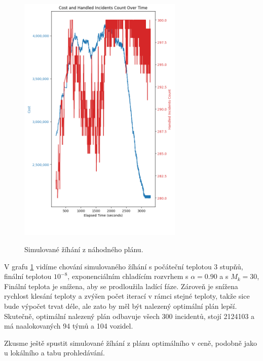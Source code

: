 \begin{figure}[H]
  \caption{Simulované žíhání z náhodného plánu.}
  \includegraphics[width=0.7\textwidth,height=0.9\textwidth]{img/plots/sa_random_90.png}
  \centering
  \label{img:sa_random}
\end{figure}

V grafu \ref{img:sa_random} vidíme chování simulovaného žíhání
s počáteční teplotou 3 stupňů, finální teplotou $10^{-8}$, exponenciálním chladícím rozvrhem s $\alpha = 0.90$ a s $M_k = 30$,
Finální teplota je snížena, aby se prodloužila ladící fáze.
Zároveň je snížena rychlost klesání teploty a zvýšen počet iterací v rámci stejné teploty, takže sice bude výpočet trvat déle, ale zato by měl být nalezený optimální plán lepší.
Skutečně, optimální nalezený plán odbavuje všech 300 incidentů, stojí 2124103 a má naalokovaných 94 týmů a 104 vozidel.

Zkusme ještě spustit simulované žíhání z plánu optimálního v ceně, podobně jako u lokálního a tabu prohledávání.

